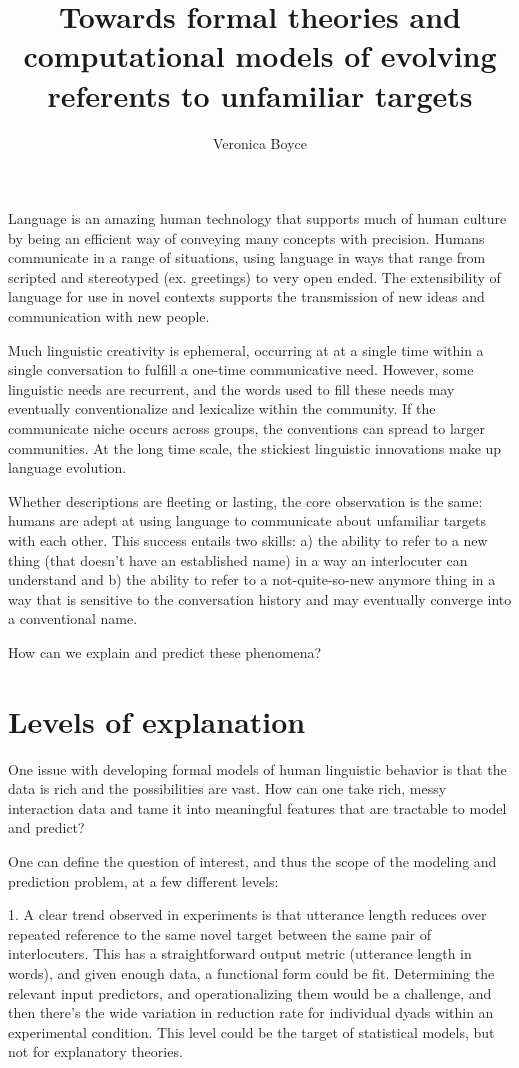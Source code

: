 \documentclass[]{article}
\title{Towards formal theories and computational models of evolving referents to unfamiliar targets}
\author{Veronica Boyce}
\begin{document}
	
	\maketitle
	
	

	
	Language is an amazing human technology that supports much of human culture by being an efficient way of conveying many concepts with precision. Humans communicate in a range of situations, using language in ways that range from scripted and stereotyped (ex. greetings) to very open ended. The extensibility of language for use in novel contexts supports the transmission of new ideas and communication with new people. 
	
	Much linguistic creativity is ephemeral, occurring at at a single time within a single conversation to fulfill a one-time communicative need.  However, some linguistic needs are recurrent, and the words used to fill these needs may eventually conventionalize and lexicalize within the community. If the communicate niche occurs across groups, the conventions can spread to larger communities.  At the long time scale, the stickiest linguistic innovations make up language evolution. 
	
	Whether descriptions are fleeting or lasting, the core observation is the same: humans are adept at using language to communicate about unfamiliar targets with each other. This success entails two skills: a) the ability to refer to a new thing (that doesn't have an established name) in a way an interlocuter can understand and b) the ability to refer to a not-quite-so-new anymore thing in a way that is sensitive to the conversation history and may eventually converge into a conventional name. 
	
	How can we explain and predict these phenomena?
	
	\section{Levels of explanation}
	One issue with developing formal models of human linguistic behavior is that the data is rich and the possibilities are vast. How can one take rich, messy interaction data and tame it into meaningful features that are tractable to model and predict? 
	
	One can define the question of interest, and thus the scope of the modeling and prediction problem, at a few different levels:
	
	1. A clear trend observed in experiments is that utterance length reduces over repeated reference to the same novel target between the same pair of interlocuters. This has a straightforward output metric (utterance length in words), and given enough data, a functional form could be fit.  Determining the relevant input predictors, and operationalizing them would be a challenge, and then there's the wide variation in reduction rate for individual dyads within an experimental condition. This level could be the target of statistical models, but not for explanatory theories. 
	
\end{document}
